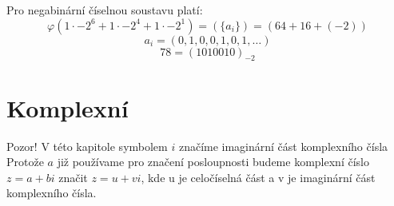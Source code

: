 \documentclass[czech,bachelor,dept470,male]{diploma}
\newcommand{\posla}{\{a_i\}_{i=0}^{\infty}}
\newcommand{\poslb}{\{b_i\}_{i=1}^{\infty}}
\begin{document}
\begin{example}
	Pro negabinární číselnou soustavu platí:
	$$\varphi(1\cdot-2^6+1\cdot-2^4+1\cdot-2^1)=(\{a_i\})=(64+16+(-2))$$
	$${a_i}=(0,1,0,0,1,0,1,\dots) $$
	$$78 =(1010010)_{-2}$$
\end{example}












\section{Komplexní}

\begin{agreement}
	Pozor! V této kapitole symbolem $i$ značíme imaginární část komplexního čísla\newline
	Protože $a$ již používame pro značení posloupnosti budeme komplexní číslo $z = a +bi$ značit $z=u+vi$, kde u je celočíselná část a v je imaginární část komplexního čísla.
\end{agreement}
\end{document}
